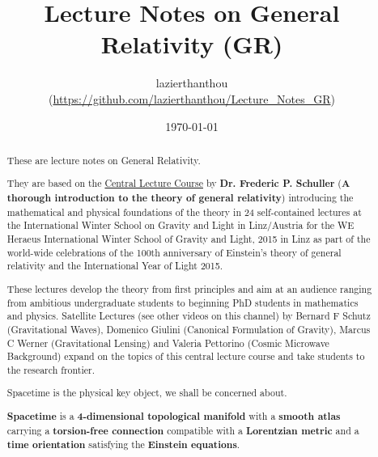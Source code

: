 \documentclass[10pt,a4paper,oneside]{article}
\theoremstyle{plain}
\theoremstyle{definition}
\theoremstyle{remark}
\numberwithin{equation}{section}
\numberwithin{figure}{section}
\numberwithin{theorem}{section}
\begin{document}

\title{Lecture Notes on General Relativity (GR)}
\author{lazierthanthou \\ (\url{https://github.com/lazierthanthou/Lecture_Notes_GR})}
\date{\today}

\maketitle

\tableofcontents

\begin{abstract}
These are lecture notes on General Relativity.

They are based on the \href{https://www.youtube.com/channel/UCUHKG3S9N_QeIE2jQXd2-VQ/feed}{Central Lecture Course} by \textbf{Dr. Frederic P. Schuller} (\textbf{A thorough introduction to the theory of general relativity}) introducing the mathematical and physical foundations of the theory in 24 self-contained lectures at the International Winter School on Gravity and Light in Linz/Austria for the WE Heraeus International Winter School of Gravity and Light, 2015 in Linz as part of the world-wide celebrations of the 100th anniversary of Einstein's theory of general relativity and the International Year of Light 2015.

These lectures develop the theory from first principles and aim at an audience ranging from ambitious undergraduate students to beginning PhD students in mathematics and physics. Satellite Lectures (see other videos on this channel) by Bernard F Schutz (Gravitational Waves), Domenico Giulini (Canonical Formulation of Gravity), Marcus C Werner (Gravitational Lensing) and Valeria Pettorino (Cosmic Microwave Background) expand on the topics of this central lecture course and take students to the research frontier.

Spacetime is the physical key object, we shall be concerned about.

\begin{framed}
\textbf{Spacetime} is a \textbf{4-dimensional topological manifold} with a \textbf{smooth atlas} carrying a \textbf{torsion-free connection} compatible with a \textbf{Lorentzian metric} and a \textbf{time orientation} satisfying the \textbf{Einstein equations}.
\end{framed}

\end{abstract}
\end{document}
